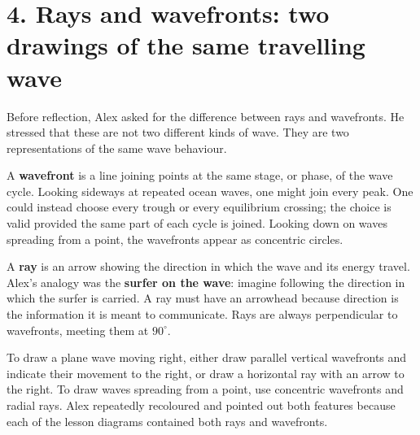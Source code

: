\documentclass[11pt,a4paper]{article}
\begin{document}
\section*{4. Rays and wavefronts: two drawings of the same travelling wave}
Before reflection, Alex asked for the difference between rays and wavefronts. He stressed that these are not two different kinds of wave. They are two representations of the same wave behaviour.

A \textbf{wavefront} is a line joining points at the same stage, or phase, of the wave cycle. Looking sideways at repeated ocean waves, one might join every peak. One could instead choose every trough or every equilibrium crossing; the choice is valid provided the same part of each cycle is joined. Looking down on waves spreading from a point, the wavefronts appear as concentric circles.

A \textbf{ray} is an arrow showing the direction in which the wave and its energy travel. Alex's analogy was the \textbf{surfer on the wave}: imagine following the direction in which the surfer is carried. A ray must have an arrowhead because direction is the information it is meant to communicate. Rays are always perpendicular to wavefronts, meeting them at $90^\circ$.

\begin{center}
\end{center}

To draw a plane wave moving right, either draw parallel vertical wavefronts and indicate their movement to the right, or draw a horizontal ray with an arrow to the right. To draw waves spreading from a point, use concentric wavefronts and radial rays. Alex repeatedly recoloured and pointed out both features because each of the lesson diagrams contained both rays and wavefronts.
\end{document}

